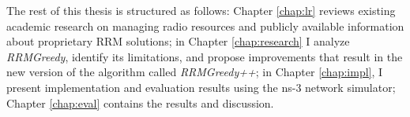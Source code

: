 
The rest of this thesis is structured as follows: Chapter \ref{chap:lr} reviews existing academic research on managing radio resources and publicly available information about proprietary RRM solutions; in Chapter \ref{chap:research} I analyze \textit{RRMGreedy}, identify its limitations, and propose improvements that result in the new version of the algorithm called \textit{RRMGreedy++}; in Chapter \ref{chap:impl}, I present implementation and evaluation results using the ns-3 network simulator; Chapter \ref{chap:eval} contains the results and discussion.

